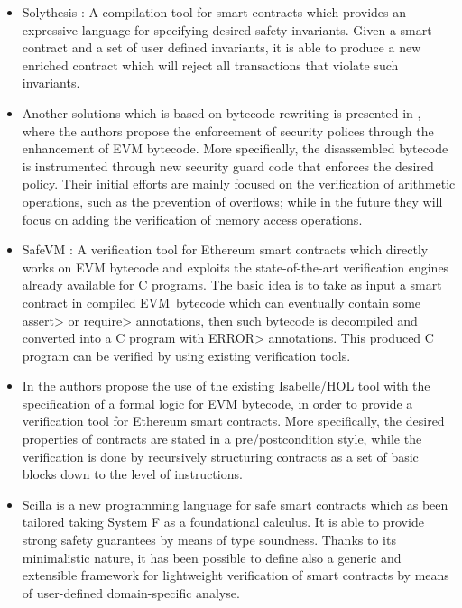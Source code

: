 \begin{itemize}
\item Solythesis \cite{solythesis_solidity_validation}: A compilation tool for smart contracts which provides an expressive language for specifying desired safety invariants. Given a smart contract and a set of user defined invariants, it is able to produce a new enriched contract which will reject all transactions that violate such invariants.

\item Another solutions which is based on bytecode rewriting is presented in \cite{bytecode_rewriting}, where the authors propose the enforcement of security polices through the enhancement of EVM bytecode. More specifically, the disassembled bytecode is instrumented through new security guard code that enforces the desired policy. Their initial efforts are mainly focused on the  verification of arithmetic operations, such as the prevention of overflows; while in the future they will focus on
adding the verification of memory access operations.

\item SafeVM \cite{safevm}:  A  verification tool for Ethereum smart contracts which directly works on EVM bytecode and exploits the state-of-the-art verification engines already available for C programs. The basic idea is to take as input a smart contract in compiled EVM\ bytecode which can eventually contain some \<assert> or \<require> annotations, then such bytecode is decompiled and converted into a C program with \<ERROR> annotations. This produced C program can be verified by using existing verification tools.
 
\item In \cite{hol_smart_constracts} the authors propose the use of the existing Isabelle/HOL tool with the specification of a formal logic for EVM bytecode, in order to provide a verification tool for Ethereum smart contracts. More specifically, the desired properties  of contracts are stated in a pre/postcondition style, while the verification is done by recursively structuring contracts as a set of basic blocks
down to the level of instructions.

\item Scilla \cite{scilla} is a new programming language for safe smart contracts which as been tailored taking   System F as a foundational calculus. It is able to provide strong safety guarantees by means of type soundness. Thanks to its minimalistic nature, it has been possible to define also a generic and extensible framework for lightweight verification of smart contracts by means of user-defined domain-specific analyse. 



 
\end{itemize}

